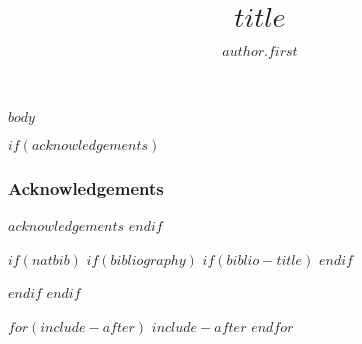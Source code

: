 \documentclass[defaultstyle,11pt]{$documentclass$}
\title{$title$}
\author{$author.first$}{$author.last$}
\begin{document}
$body$


\newpage
$if(acknowledgements)$
\subsubsection*{Acknowledgements}
{\small $acknowledgements$}
$endif$


$if(natbib)$
$if(bibliography)$
$if(biblio-title)$
\renewcommand\refname{$biblio-title$}
$endif$

$endif$
$endif$


$for(include-after)$
$include-after$
$endfor$
\end{document}
